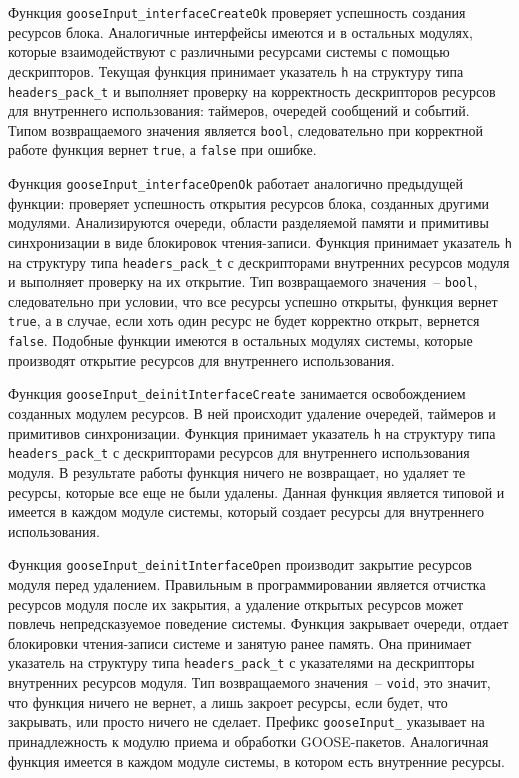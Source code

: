 Функция \lstinline{gooseInput_interfaceCreateOk} проверяет успешность создания
ресурсов блока. Аналогичные интерфейсы имеются и в остальных модулях, которые
взаимодействуют с различными ресурсами системы с помощью дескрипторов.
Текущая функция принимает указатель \lstinline{h}
на структуру типа \lstinline{headers_pack_t} и выполняет проверку
на корректность дескрипторов ресурсов для внутреннего использования:
таймеров, очередей сообщений и событий.
Типом возвращаемого значения является \lstinline{bool}, следовательно при корректной работе функция вернет \lstinline{true}, а \lstinline{false} при ошибке.

Функция \lstinline{gooseInput_interfaceOpenOk} работает аналогично предыдущей
функции:
проверяет успешность открытия ресурсов блока, созданных другими модулями.
Анализируются очереди, области разделяемой памяти и примитивы синхронизации
в виде блокировок чтения-записи. Функция принимает указатель \lstinline{h}
на структуру типа \lstinline{headers_pack_t}
с дескрипторами внутренних ресурсов модуля и выполняет проверку
на их открытие.
Тип возвращаемого значения~-- \lstinline{bool}, следовательно при условии, что
все ресурсы успешно открыты, функция вернет \lstinline{true}, а в случае,
если хоть один ресурс не будет корректно открыт, вернется \lstinline{false}.
Подобные функции имеются в остальных модулях системы,
которые производят открытие ресурсов для внутреннего использования.

Функция \lstinline{gooseInput_deinitInterfaceCreate} занимается освобождением созданных модулем ресурсов. В ней происходит удаление очередей, таймеров
и примитивов синхронизации.
Функция принимает указатель \lstinline{h} на структуру типа
\lstinline{headers_pack_t} с дескрипторами ресурсов для внутреннего использования
модуля.
В результате работы функция ничего не возвращает, но удаляет те ресурсы,
которые все еще не были удалены.
Данная функция является типовой и имеется в каждом модуле системы,
который создает ресурсы для внутреннего использования.

Функция \lstinline{gooseInput_deinitInterfaceOpen} производит закрытие ресурсов модуля перед удалением. Правильным в программировании является отчистка ресурсов модуля после их закрытия, а удаление открытых ресурсов может повлечь непредсказуемое поведение системы. Функция закрывает очереди, отдает блокировки чтения-записи системе и занятую ранее память. Она принимает указатель на структуру типа \lstinline{headers_pack_t} с указателями на дескрипторы внутренних ресурсов модуля. Тип возвращаемого значения~-- \lstinline{void}, это значит, что функция ничего не вернет, а лишь закроет ресурсы, если будет, что закрывать, или просто ничего не сделает. Префикс \lstinline{gooseInput_} указывает на принадлежность к модулю приема и обработки GOOSE-пакетов. Аналогичная функция имеется в каждом модуле системы, в котором есть внутренние ресурсы.

